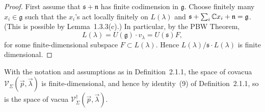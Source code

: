 \documentclass[12pt]{article}
\begin{document}
\begin{proof}
    First assume that $\mathfrak s+\mathfrak n$ has finite codimension in $\mathfrak g$.
    Choose finitely many $x_i\in\mathfrak g$ such that the $x_i$'s act locally finitely on $L(\lambda)$
    and $\mathfrak s+\sum_i \mathbb{C} x_i+\mathfrak n = \mathfrak g$.
    (This is possible by Lemma~1.3.3(c).)
    In particular, by the PBW Theorem,
    \[
        L(\lambda)
        = U(\mathfrak g)\cdot v_\lambda
        = U(\mathfrak s)F,
    \]
    for some finite-dimensional subspace $F\subset L(\lambda)$.
    Hence $L(\lambda)/\mathfrak s\cdot L(\lambda)$ is finite dimensional.
\end{proof}

\begin{lemma}[Lemma~2.1.4]
    With the notation and assumptions as in Definition~2.1.1,
    the space of covacua $\mathcal V_{\Sigma}(\vec p,\vec\lambda)$ is finite-dimensional,
    and hence by identity~(9) of Definition~2.1.1, so is the space of vacua
    $\mathcal V^{\dagger}_{\Sigma}(\vec p,\vec\lambda)$.
\end{lemma}
\end{document}

